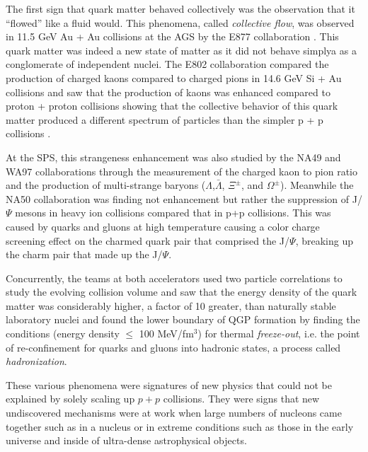 The first sign that quark matter behaved collectively was the observation that it ``flowed'' like a fluid would. This phenomena, called \textit{collective flow}, was observed in 11.5 GeV Au + Au collisions at the AGS by the E877 collaboration \citep{Barrette:1999rx}. This quark matter was indeed a new state of matter as it did not behave simplya as a conglomerate of independent nuclei. The E802 collaboration compared the production of charged kaons compared to charged pions in 14.6 GeV Si + Au collisions and saw that the production of kaons was enhanced compared to proton + proton collisions showing that the collective behavior of this quark matter produced a different spectrum of particles than the simpler p + p collisions \citep{PhysRevLett.64.847}. 

At the SPS, this strangeness enhancement was also studied by the NA49\citep{Hohne:1999jf} and WA97 collaborations through the measurement of the charged kaon to pion ratio and the production of multi-strange baryons ($\Lambda$,$\bar{\Lambda}$, $\Xi^{\pm}$, and $\Omega^{\pm}$). Meanwhile the NA50 collaboration was finding not enhancement but rather the suppression of J/$\Psi$ mesons in heavy ion collisions compared that in p+p collisions\citep{Abreu:2000ni}. This was caused by quarks and gluons at high temperature causing a color charge screening effect on the charmed quark pair that comprised the J/$\Psi$, breaking up the charm pair that made up the J/$\Psi$.

Concurrently, the teams at both accelerators used two particle correlations to study the evolving collision volume and saw that the energy density of the quark matter was considerably higher, a factor of 10 greater, than naturally stable laboratory nuclei \citep{Heinz:1999rw} and found the lower boundary of QGP formation by finding the conditions (energy density $\leq$ 100 MeV/fm$^{3}$) for thermal \textit{freeze-out}\citep{BraunMunzinger:1998cg}, i.e. the point of re-confinement for quarks and gluons into hadronic states, a process called \textit{hadronization}.

These various phenomena were signatures of new physics that could not be explained by solely scaling up $p+p$ collisions. They were signs that new undiscovered mechanisms were at work when large numbers of nucleons came together such as in a nucleus or in extreme conditions such as those in the early universe and inside of ultra-dense astrophysical objects. 
\pagebreak
\pagebreak
